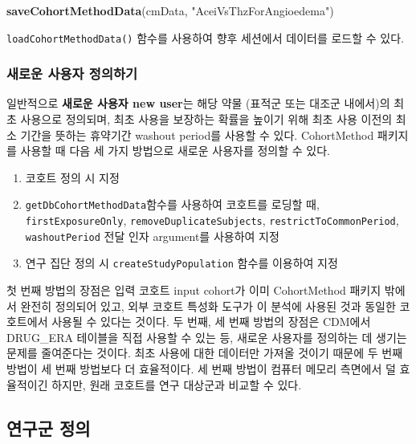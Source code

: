 \documentclass[10.5pt]{book}
\newenvironment{Shaded}{\begin{snugshade}}{\end{snugshade}}
\newcommand{\KeywordTok}[1]{\textcolor[rgb]{0.13,0.29,0.53}{\textbf{#1}}}
\newcommand{\StringTok}[1]{\textcolor[rgb]{0.31,0.60,0.02}{#1}}
\newcommand{\NormalTok}[1]{#1}
\providecommand{\tightlist}{%
  \setlength{\itemsep}{0pt}\setlength{\parskip}{0pt}}
\theoremstyle{definition}
\theoremstyle{definition}
\theoremstyle{definition}
\theoremstyle{remark}
\begin{document}
\begin{Shaded}
\begin{Highlighting}[]
\KeywordTok{saveCohortMethodData}\NormalTok{(cmData, }\StringTok{"AceiVsThzForAngioedema"}\NormalTok{)}
\end{Highlighting}
\end{Shaded}

\texttt{loadCohortMethodData()} 함수를 사용하여 향후 세션에서 데이터를
로드할 수 있다.

\subsubsection*{새로운 사용자 정의하기}\label{--}

일반적으로 \textbf{새로운 사용자 new user}는 해당 약물 (표적군 또는
대조군 내에서)의 최초 사용으로 정의되며, 최초 사용을 보장하는 확률을
높이기 위해 최초 사용 이전의 최소 기간을 뜻하는 휴약기간 washout
period를 사용할 수 있다. CohortMethod 패키지를 사용할 때 다음 세 가지
방법으로 새로운 사용자를 정의할 수 있다.

\begin{enumerate}
\def\labelenumi{\arabic{enumi}.}
\tightlist
\item
  코호트 정의 시 지정
\item
  \texttt{getDbCohortMethodData}함수를 사용하여 코호트를 로딩할 때,
  \texttt{firstExposureOnly}, \texttt{removeDuplicateSubjects},
  \texttt{restrictToCommonPeriod}, \texttt{washoutPeriod} 전달 인자
  argument를 사용하여 지정
\item
  연구 집단 정의 시 \texttt{createStudyPopulation} 함수를 이용하여 지정
\end{enumerate}

첫 번째 방법의 장점은 입력 코호트 input cohort가 이미 CohortMethod
패키지 밖에서 완전히 정의되어 있고, 외부 코호트 특성화 도구가 이 분석에
사용된 것과 동일한 코호트에서 사용될 수 있다는 것이다. 두 번째, 세 번째
방법의 장점은 CDM에서 DRUG\_ERA 테이블을 직접 사용할 수 있는 등, 새로운
사용자를 정의하는 데 생기는 문제를 줄여준다는 것이다. 최초 사용에 대한
데이터만 가져올 것이기 때문에 두 번째 방법이 세 번째 방법보다 더
효율적이다. 세 번째 방법이 컴퓨터 메모리 측면에서 덜 효율적이긴 하지만,
원래 코호트를 연구 대상군과 비교할 수 있다.

\subsection{연구군 정의}\label{-}
\end{document}

